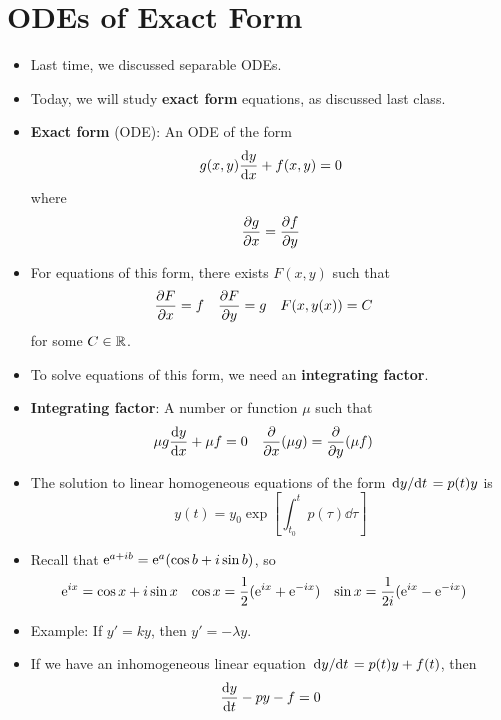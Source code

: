 \documentclass[../notes.tex]{subfiles}
\begin{document}
\section{ODEs of Exact Form}
\begin{itemize}
    \item {}Last time, we discussed separable ODEs.
    \item Today, we will study \textbf{exact form} equations, as discussed last class.
    \item \textbf{Exact form} (ODE): An ODE of the form
    \begin{equation*}
        g(x,y)\dv{y}{x}+f(x,y) = 0
    \end{equation*}
    where
    \begin{equation*}
        \pdv{g}{x} = \pdv{f}{y}
    \end{equation*}
    \item For equations of this form, there exists $F(x,y)$ such that
    \begin{align*}
        \pdv{F}{x} &= f&
        \pdv{F}{y} &= g&
        F(x,y(x)) &= C
    \end{align*}
    for some $C\in\R$.
    \item To solve equations of this form, we need an \textbf{integrating factor}.
    \item \textbf{Integrating factor}: A number or function $\mu$ such that
    \begin{align*}
        \mu g\dv{y}{x}+\mu f &= 0&
        \pdv{x}(\mu g) &= \pdv{y}(\mu f)
    \end{align*}
    \item The solution to linear homogeneous equations of the form $\dv*{y}{t}=p(t)y$ is
    \begin{equation*}
        y(t) = y_0\exp[\int_{t_0}^tp(\tau)\dd\tau]
    \end{equation*}
    \item Recall that $\e[a+ib]=\e[a](\cos b+i\sin b)$, so
    \begin{align*}
        \e[ix] &= \cos x+i\sin x&
        \cos x &= \frac{1}{2}(\e[ix]+\e[-ix])&
        \sin x &= \frac{1}{2i}(\e[ix]-\e[-ix])
    \end{align*}
    \item Example: If $y'=ky$, then $y'=-\lambda y$.
    \item If we have an inhomogeneous linear equation $\dv*{y}{t}=p(t)y+f(t)$, then
    \begin{equation*}
        \dv{y}{t}-py-f = 0

\end{equation*}
\end{itemize}
\end{document}
